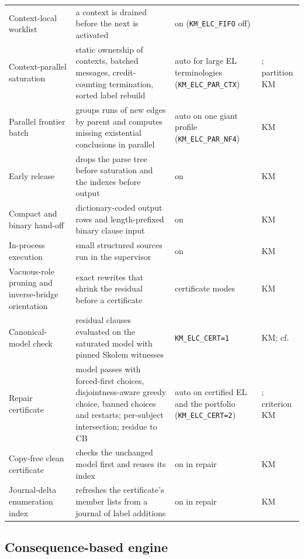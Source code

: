 \begin{small}
\begin{longtable}{@{}p{}p{}p{}p{}@{}}
Context-local worklist & a context is drained before the next is activated & on (\texttt{KM\_ELC\_FIFO} off) & \cite{kazakov2011concurrent,kazakov2014elk}\\
Context-parallel saturation & static ownership of contexts, batched messages, credit-counting termination, sorted label rebuild & auto for large EL terminologies (\texttt{KM\_ELC\_PAR\_CTX}) & \cite{kazakov2011concurrent,mattern1989credit}; partition KM\\
Parallel frontier batch & groups runs of new edges by parent and computes missing existential conclusions in parallel & auto on one giant profile (\texttt{KM\_ELC\_PAR\_NF4}) & KM\\
Early release & drops the parse tree before saturation and the indexes before output & on & KM\\
Compact and binary hand-off & dictionary-coded output rows and length-prefixed binary clause input & on & KM\\
In-process execution & small structured sources run in the supervisor & on & KM\\
Vacuous-role pruning and inverse-bridge orientation & exact rewrites that shrink the residual before a certificate & certificate modes & KM\\
Canonical-model check & residual clauses evaluated on the saturated model with pinned Skolem witnesses & \texttt{KM\_ELC\_CERT=1} & KM; cf.\ \cite{grau2012completeness}\\
Repair certificate & model passes with forced-first choices, disjointness-aware greedy choice, banned choices and restarts; per-subject intersection; residue to CB & auto on certified EL and the portfolio (\texttt{KM\_ELC\_CERT=2}) & \cite{zhou2015pagoda,marquessilva1999grasp}; criterion KM\\
Copy-free clean certificate & checks the unchanged model first and reuses its index & on in repair & KM\\
Journal-delta enumeration index & refreshes the certificate's member lists from a journal of label additions & on in repair & KM\\
\bottomrule
\end{longtable}
\end{small}

\subsection{Consequence-based engine}

